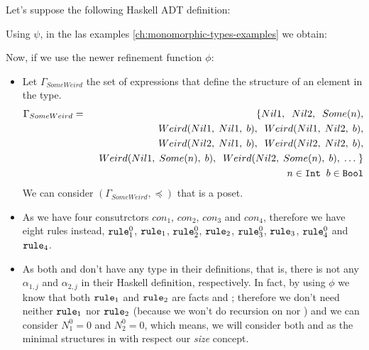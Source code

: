 	\begin{example}[SomeWeird]
		Let's suppose the following Haskell ADT definition:
		
		Using $\psi$, in the las examples \ref{ch:monomorphic-types-examples} we obtain:
		
		Now, if we use the newer refinement function $\phi$:
		\begin{itemize}
			\item Let $\Gamma_{SomeWeird}$ the set of expressions that define the structure of an element in the  type.
			      \begin{eqnarray*}
			      	\Gamma_{SomeWeird} & = & \{ Nil1, \;\; Nil2, \;\; Some(n), \\
			      	&& \;\; Weird(Nil1, \; Nil1, \; b), \;\; Weird(Nil1, \; Nil2, \; b), \\
			      	&& \;\; Weird(Nil2, \; Nil1, \; b), \;\; Weird(Nil2, \; Nil2, \; b),  \\
			      	&& \;\; Weird(Nil1, \; Some(n), \; b), \;\; Weird(Nil2, \; Some(n), \; b), \; \ldots \; \} \\
			      	&& \;\; n \in \texttt{Int} \;\; b \in \texttt{Bool}
			      \end{eqnarray*}
			      We can consider $(\Gamma_{SomeWeird}, \preceq)$ that is a poset.
			\item As we have four consutrctors $con_1$, $con_2$, $con_3$ and $con_4$, therefore we have eight rules instead, $\texttt{rule}_{1}^{0}$, $\texttt{rule}_1$, $\texttt{rule}_{2}^{0}$, $\texttt{rule}_2$, $\texttt{rule}_{3}^{0}$, $\texttt{rule}_3$, $\texttt{rule}_{4}^{0}$ and $\texttt{rule}_4$.
			\item As both  and  don't have any type in their definitions, that is, there is not any $\alpha_{1,j}$ and $\alpha_{2,j}$ in their Haskell definition, respectively. In fact, by using $\phi$ we know that both $\texttt{rule}_1$ and $\texttt{rule}_2$ are facts  and ; therefore we don't need neither $\texttt{rule}_1$ nor $\texttt{rule}_2$ (because we won't do recursion on  nor ) and we can consider $N_{1}^{0} = 0$ and $N_{2}^{0} = 0$, which means, we will consider both  and  as the minimal structures in  with respect our \textit{size} concept.\\\\

\end{itemize}
\end{example}

